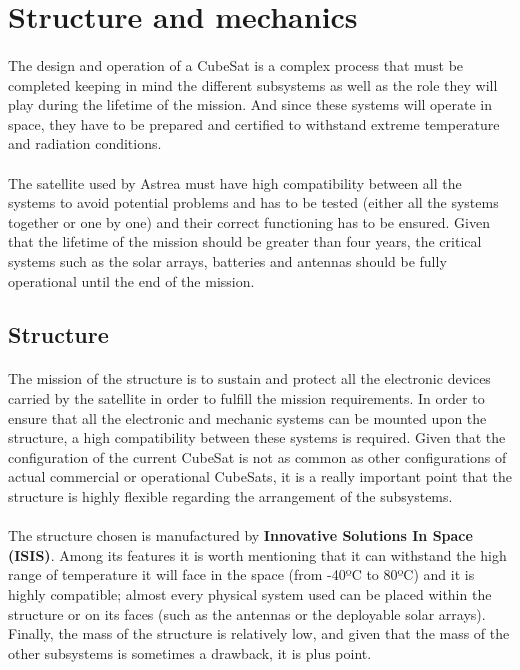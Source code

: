 \section{Structure and mechanics}

\paragraph{}The design and operation of a CubeSat is a complex process that must be completed keeping in mind the different subsystems as well as the role they will play during the lifetime of the mission. And since these systems will operate in space, they have to be prepared and certified to withstand extreme temperature and radiation conditions.

\paragraph{}The satellite used by Astrea must have high compatibility between all the systems to avoid potential problems and has to be tested (either all the systems together or one by one) and their correct functioning has to be ensured. Given that the lifetime of the mission should be greater than four years, the critical systems such as the solar arrays, batteries and antennas should be fully operational until the end of the mission.

\subsection{Structure}

\paragraph{}The mission of the structure is to sustain and protect all the electronic devices carried by the satellite in order to fulfill the mission requirements. In order to ensure that all the electronic and mechanic systems can be mounted upon the structure, a high compatibility between these systems is required. Given that the configuration of the current CubeSat is not as common as other configurations of actual commercial or operational CubeSats, it is a really important point that the structure is highly flexible regarding the arrangement of the subsystems.

\paragraph{}The structure chosen is manufactured by \textbf{Innovative Solutions In Space (ISIS)}. Among its features it is worth mentioning that it can withstand the high range of temperature it will face in the space (from -40ºC to 80ºC) and it is highly compatible; almost every physical system  used can be placed within the structure or on its faces (such as the antennas or the deployable solar arrays). Finally, the mass of the structure is relatively low, and given that the mass of the other subsystems is sometimes a drawback, it is plus point.

